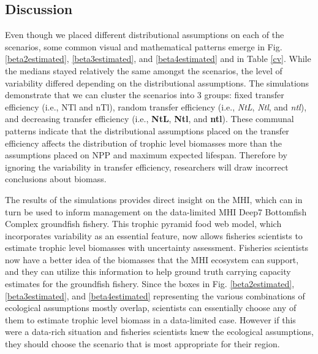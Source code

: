 \documentclass[oneside,12pt,final]{sty/ucthesis-CA2012}
\begin{document}
\begin{mainmatter}
\section*{Discussion}
Even though we placed different distributional assumptions on each of the scenarios, some common visual and mathematical patterns emerge in Fig. \ref{beta2estimated}, \ref{beta3estimated}, and \ref{beta4estimated} and in Table \ref{cv}. While the medians stayed relatively the same amongst the scenarios, the level of variability differed depending on the distributional assumptions. The simulations demonstrate that we can cluster the scenarios into 3 groups: fixed transfer efficiency (i.e., NTl and nTl), random transfer efficiency (i.e., \textit{NtL}, \textit{Ntl}, and \textit{ntl}), and decreasing transfer efficiency (i.e., \textbf{NtL}, \textbf{Ntl}, and \textbf{ntl}). These communal patterns indicate that the distributional assumptions placed on the transfer efficiency affects the distribution of trophic level biomasses more than the assumptions placed on NPP and maximum expected lifespan. Therefore by ignoring the variability in transfer efficiency, researchers will draw incorrect conclusions about biomass. 

\vspace{5mm} 

The results of the simulations provides direct insight on the MHI, which can in turn be used to inform management on the data-limited MHI Deep7 Bottomfish Complex groundfish fishery. This trophic pyramid food web model, which incorporates variability as an essential feature, now allows fisheries scientists to estimate trophic level biomasses with uncertainty assessment. Fisheries scientists now have a better idea of the biomasses that the MHI ecosystem can support, and they can utilize this information to help ground truth carrying capacity estimates for the groundfish fishery. Since the boxes in Fig. \ref{beta2estimated}, \ref{beta3estimated}, and \ref{beta4estimated} representing the various combinations of ecological assumptions mostly overlap, scientists can essentially choose any of them to estimate trophic level biomass in a data-limited case. However if this were a data-rich situation and fisheries scientists knew the ecological assumptions, they should choose the scenario that is most appropriate for their region.
 
\vspace{5mm} 


\end{mainmatter}
\end{document}
